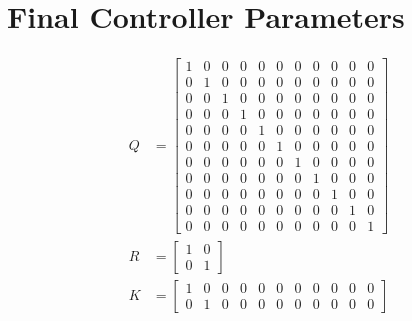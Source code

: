\documentclass{sydeStyle}
\begin{document}
\chapter{Final Controller Parameters}
\label{sec:ctrlvals}

\setcounter{MaxMatrixCols}{20}
\begin{align*}
    Q &=
    \begin{bmatrix}
        1 & 0 & 0 & 0 & 0 & 0 & 0 & 0 & 0 & 0 & 0 \\
        0 & 1 & 0 & 0 & 0 & 0 & 0 & 0 & 0 & 0 & 0 \\
        0 & 0 & 1 & 0 & 0 & 0 & 0 & 0 & 0 & 0 & 0 \\
        0 & 0 & 0 & 1 & 0 & 0 & 0 & 0 & 0 & 0 & 0 \\
        0 & 0 & 0 & 0 & 1 & 0 & 0 & 0 & 0 & 0 & 0 \\
        0 & 0 & 0 & 0 & 0 & 1 & 0 & 0 & 0 & 0 & 0 \\
        0 & 0 & 0 & 0 & 0 & 0 & 1 & 0 & 0 & 0 & 0 \\
        0 & 0 & 0 & 0 & 0 & 0 & 0 & 1 & 0 & 0 & 0 \\
        0 & 0 & 0 & 0 & 0 & 0 & 0 & 0 & 1 & 0 & 0 \\
        0 & 0 & 0 & 0 & 0 & 0 & 0 & 0 & 0 & 1 & 0 \\
        0 & 0 & 0 & 0 & 0 & 0 & 0 & 0 & 0 & 0 & 1
    \end{bmatrix}
    \\
    R &=
    \begin{bmatrix}
        1 & 0 \\
        0 & 1
    \end{bmatrix}
    \\
    K &=
    \begin{bmatrix}
        1 & 0 & 0 & 0 & 0 & 0 & 0 & 0 & 0 & 0 & 0 \\
        0 & 1 & 0 & 0 & 0 & 0 & 0 & 0 & 0 & 0 & 0
    \end{bmatrix}
\end{align*}


\end{document}
